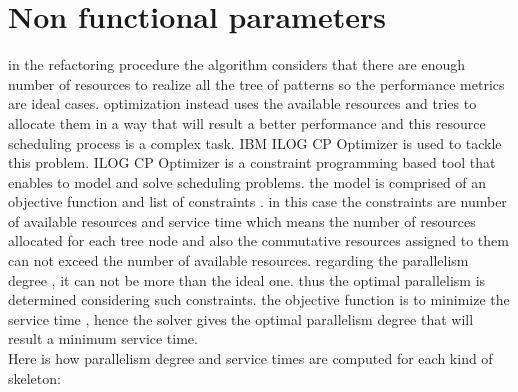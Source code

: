 \documentclass[12pt]{report}
\begin{document}
\section{Non functional parameters}
in the refactoring procedure the algorithm considers that there are enough number of resources to realize all the tree of patterns so the performance metrics are ideal cases. optimization instead uses the available resources and tries to allocate them in a way that will result a better performance and this resource scheduling process is a complex task. IBM ILOG CP Optimizer is used to tackle this problem. ILOG CP Optimizer is a constraint programming based tool that enables to model and solve scheduling problems. 
the model is comprised of an objective function and list of constraints . in this case the constraints are number of available resources and service time which means the number of resources allocated for each tree node and also the commutative resources assigned to them can not exceed the number of available resources. regarding the parallelism degree , it can not be more than the ideal one. thus the optimal parallelism is determined considering such constraints. the objective function is to minimize the service time , hence the solver gives the optimal parallelism degree that will result a minimum service time.\\
Here is how  parallelism degree and service times are computed for each kind of skeleton:
\end{document}
